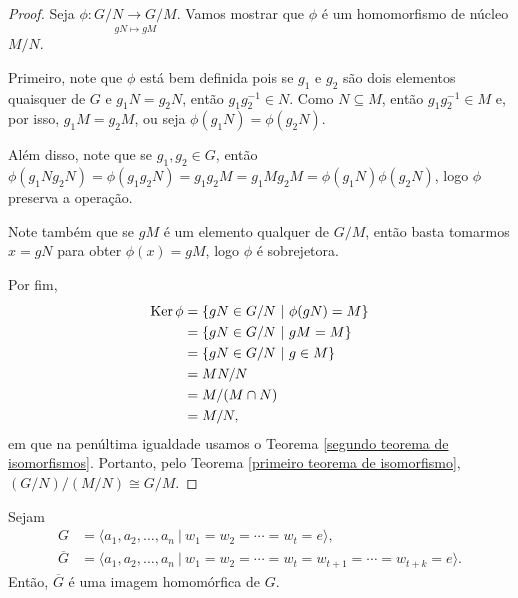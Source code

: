 	\begin{proof}
		Seja $\phi:\underset{gN\mapsto gM}{G/N\to G/M}$. Vamos mostrar que $\phi$ é um homomorfismo 
		de núcleo $M/N$.
		\par\vspace{0.3cm} Primeiro, note que $\phi$ está bem definida pois se $g_1$ e $g_2$ são 
		dois elementos quaisquer de $G$ e $g_1N=g_2N$, então $g_1g_2^{-1}\in N$. Como $N\subseteq M$, 
		então $g_1g_2^{-1}\in M$ e, por isso, $g_1M=g_2M$, ou seja $\phi(g_1N)=\phi(g_2N)$.
		
		\par\vspace{0.3cm} Além disso, note que se $g_1,g_2\in G$, então
		$\phi(g_1Ng_2N)=\phi(g_1g_2N)=g_1g_2M=g_1Mg_2M=\phi(g_1N)\phi(g_2N)$, logo $\phi$ preserva a operação.
		
		\par\vspace{0.3cm} Note também que se $gM$ é um elemento qualquer de $G/M$, então basta tomarmos 
		$x=gN$ para obter $\phi(x)=gM$, logo $\phi$ é sobrejetora.
		
		\par\vspace{0.3cm} Por fim, 
		\begin{align*}
		\operatorname{Ker}\phi &= \{gN\in G/N \ | \ \phi(gN) = M\} \\
		         &= \{gN\in G/N \ | \ gM = M\} \\
		         &= \{gN\in G/N \ | \ g\in M\} \\
		         &= MN/N \\
		         &= M/(M\cap N) \\
		         &= M/N,
		\end{align*}
		em que na penúltima igualdade usamos o 
		Teorema \ref{segundo teorema de isomorfismos}. Portanto, pelo 
		Teorema \ref{primeiro teorema de isomorfismo}, $(G/N)/(M/N)\cong G/M$.
	\end{proof}
	\begin{theorem}
	\label{teorema de Dyck}
		Sejam 
		\begin{align*}
		    G &= 
		    \langle 
		    a_1, a_2, \dots, a_n \ | \ w_1 = w_2 = \cdots = w_t = e 
		    \rangle, \\
		    \overline{G} &= 
		    \langle 
		    a_1, a_2, \dots, a_n \ | \ w_1 = w_2 = \cdots = w_t = w_{t+1} = \cdots = w_{t+k} = e \rangle.
		\end{align*}
		Então, $\overline{G}$ é uma imagem homomórfica de $G$.
	\end{theorem}
